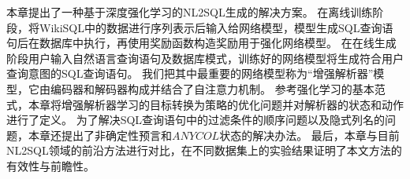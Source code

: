 本章提出了一种基于深度强化学习的NL2SQL生成的解决方案。
在离线训练阶段，将WikiSQL中的数据进行序列表示后输入给网络模型，模型生成SQL查询语句后在数据库中执行，再使用奖励函数构造奖励用于强化网络模型。
在在线生成阶段用户输入自然语言查询语句及数据库模式，训练好的网络模型将生成符合用户查询意图的SQL查询语句。
我们把其中最重要的网络模型称为“增强解析器”模型，它由编码器和解码器构成并结合了自注意力机制。
参考强化学习的基本范式，本章将增强解析器学习的目标转换为策略的优化问题并对解析器的状态和动作进行了定义。
为了解决SQL查询语句中的过滤条件的顺序问题以及隐式列名的问题，本章还提出了非确定性预言和$ANYCOL$状态的解决办法。
最后，本章与目前NL2SQL领域的前沿方法进行对比，在不同数据集上的实验结果证明了本文方法的有效性与前瞻性。